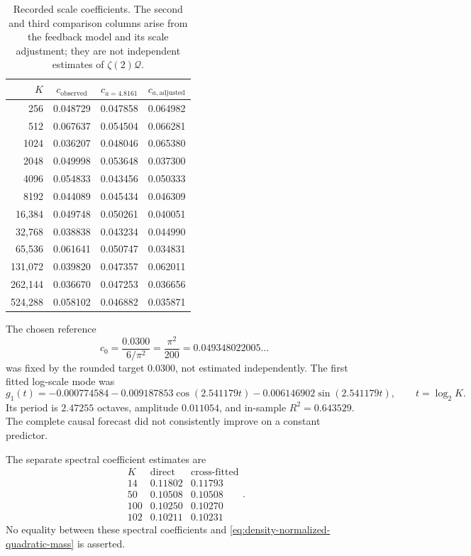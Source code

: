 \documentclass[11pt,reqno]{amsart}
\numberwithin{equation}{section}
\theoremstyle{plain}
\theoremstyle{definition}
\theoremstyle{remark}
\newcommand{\QF}{\mathcal Q}
\begin{document}
\begin{table}[htbp]
\centering
\small
\caption{Recorded scale coefficients.  The second and third comparison
columns arise from the feedback model and its scale adjustment; they are not
independent estimates of \(\zeta(2)\QF\).}
\label{tab:support-coefficients}
\begin{tabular}{r c c c}
\toprule
\(K\)&\(c_{\mathrm{observed}}\)&\(c_{a=4.8161}\)&\(c_{a,\mathrm{adjusted}}\)\\
\midrule
256&0.048729&0.047858&0.064982\\
512&0.067637&0.054504&0.066281\\
1024&0.036207&0.048046&0.065380\\
2048&0.049998&0.053648&0.037300\\
4096&0.054833&0.043456&0.050333\\
8192&0.044089&0.045434&0.046309\\
16,384&0.049748&0.050261&0.040051\\
32,768&0.038838&0.043234&0.044990\\
65,536&0.061641&0.050747&0.034831\\
131,072&0.039820&0.047357&0.062011\\
262,144&0.036670&0.047253&0.036656\\
524,288&0.058102&0.046882&0.035871\\
\bottomrule
\end{tabular}
\end{table}
The chosen reference
\begin{equation}
c_0=\frac{0.0300}{6/\pi^2}=\frac{\pi^2}{200}
=0.049348022005\ldots
\label{eq:chosen-feedback-reference}
\end{equation}
was fixed by the rounded target \(0.0300\), not estimated independently.
The first fitted log-scale mode was
\begin{equation}
g_1(t)=-0.000774584
-0.009187853\cos(2.541179t)
-0.006146902\sin(2.541179t),
\qquad t=\log_2K.
\label{eq:first-feedback-mode}
\end{equation}
Its period is \(2.47255\) octaves, amplitude \(0.011054\), and in-sample
\(R^2=0.643529\).  The complete causal forecast did not consistently improve
on a constant predictor.

The separate spectral coefficient estimates are
\begin{equation}
\begin{array}{c|cc}
K&\text{direct}&\text{cross-fitted}\\ \hline
14&0.11802&0.11793\\
50&0.10508&0.10508\\
100&0.10250&0.10270\\
102&0.10211&0.10231
\end{array}.
\label{eq:spectral-coefficient-table}
\end{equation}
No equality between these spectral coefficients and
\eqref{eq:density-normalized-quadratic-mass} is asserted.
\end{document}
